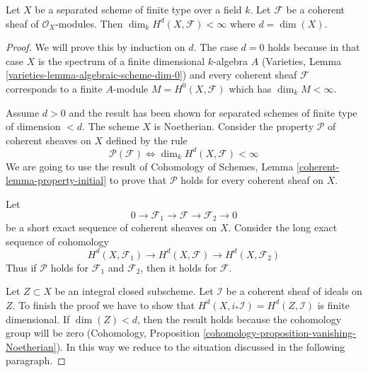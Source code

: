 %
\begin{lemma}
\label{lemma-top-cohomology-coherent}
Let $X$ be a separated scheme of finite type over a field $k$.
Let $\mathcal{F}$ be a coherent sheaf of $\mathcal{O}_X$-modules.
Then $\dim_k H^d(X, \mathcal{F}) < \infty$ where $d = \dim(X)$.
\end{lemma}

\begin{proof}
We will prove this by induction on $d$. The case $d = 0$ holds because
in that case $X$ is the spectrum of a finite dimensional $k$-algebra $A$
(Varieties, Lemma \ref{varieties-lemma-algebraic-scheme-dim-0})
and every coherent sheaf $\mathcal{F}$ corresponds to a finite $A$-module
$M = H^0(X, \mathcal{F})$ which has $\dim_k M < \infty$.

\medskip\noindent
Assume $d > 0$ and the result has been shown for separated schemes
of finite type of dimension $< d$. The scheme $X$ is Noetherian. Consider
the property $\mathcal{P}$ of coherent sheaves on $X$ defined by the rule
$$
\mathcal{P}(\mathcal{F}) \Leftrightarrow
\dim_k H^d(X, \mathcal{F}) < \infty
$$
We are going to use the result of
Cohomology of Schemes, Lemma \ref{coherent-lemma-property-initial}
to prove that $\mathcal{P}$ holds for every coherent sheaf on $X$.

\medskip\noindent
Let
$$
0 \to \mathcal{F}_1 \to \mathcal{F} \to \mathcal{F}_2 \to 0
$$
be a short exact sequence of coherent sheaves on $X$.
Consider the long exact sequence of cohomology
$$
H^d(X, \mathcal{F}_1) \to
H^d(X, \mathcal{F}) \to
H^d(X, \mathcal{F}_2)
$$
Thus if $\mathcal{P}$ holds for $\mathcal{F}_1$ and $\mathcal{F}_2$,
then it holds for $\mathcal{F}$.

\medskip\noindent
Let $Z \subset X$ be an integral closed subscheme. Let $\mathcal{I}$
be a coherent sheaf of ideals on $Z$. To finish the proof we have to show
that $H^d(X, i_*\mathcal{I}) = H^d(Z, \mathcal{I})$ is finite dimensional.
If $\dim(Z) < d$, then the result holds because the cohomology group
will be zero (Cohomology, Proposition
\ref{cohomology-proposition-vanishing-Noetherian}).
In this way we reduce to the situation discussed in the following paragraph.


\end{proof}
